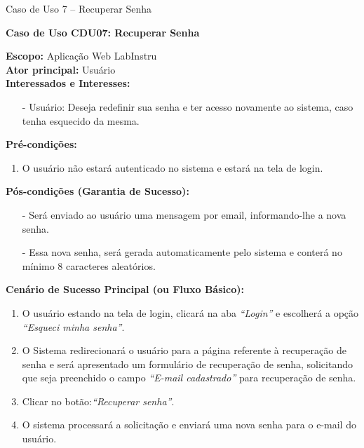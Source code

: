 \begin{quadro}[h!]\caption{Caso de Uso 7 -- Recuperar Senha}
\hfill
\end{quadro}
	\begin{mdframed}

		\textbf{Caso de Uso CDU07: Recuperar Senha}\\

		\begin{flushleft}

		\textbf{Escopo:} Aplicação Web LabInstru\\

		\textbf{Ator principal:} Usuário\\

		\textbf{Interessados e Interesses:}
		\begin{itemize}
			\item[-] Usuário: Deseja redefinir sua senha e ter acesso novamente ao sistema, caso tenha esquecido da mesma.
		\end{itemize}

		\textbf{Pré-condições:}\\
			 \begin{enumerate}
			 	\item{O usuário não estará autenticado no sistema e estará na tela de login.}
			 \end{enumerate}

		\textbf{Pós-condições (Garantia de Sucesso):}
		\begin{itemize}
			\item[-] Será enviado ao usuário uma mensagem por email, informando-lhe a nova senha.
			\item[-] Essa nova senha, será gerada automaticamente pelo sistema e conterá no mínimo 8 caracteres aleatórios.
		\end{itemize}

		\textbf{Cenário de Sucesso Principal (ou Fluxo Básico):}\\
			\begin{enumerate}
			 	\item{O usuário estando na tela de login, clicará na aba \textit{``Login''} e escolherá a opção \textit{``Esqueci minha senha''}.}
			 	\item{O Sistema redirecionará o usuário para a página referente à recuperação de senha e será apresentado um formulário de recuperação de senha, solicitando que seja preenchido o campo \textit{``E-mail cadastrado''} para recuperação de senha.}
			 	\item{Clicar no botão:\textit{``Recuperar senha''}.}
			 	\item{O sistema processará a solicitação e enviará uma nova senha para o e-mail do usuário.}
			 \end{enumerate}


\end{flushleft}
\end{mdframed}
